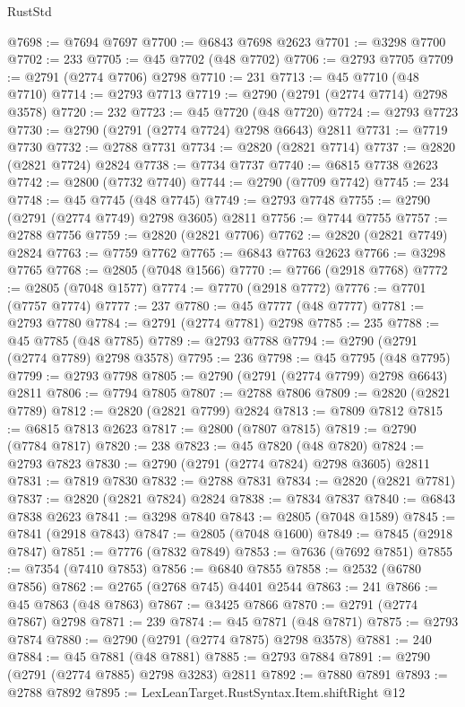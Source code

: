 \begin{lexlean}{RustStd}
\begin{coremodule}
@7698 := @7694 @7697
@7700 := @6843 @7698 @2623
@7701 := @3298 @7700
@7702 := 233
@7705 := @45 @7702 (@48 @7702)
@7706 := @2793 @7705
@7709 := @2791 (@2774 @7706) @2798
@7710 := 231
@7713 := @45 @7710 (@48 @7710)
@7714 := @2793 @7713
@7719 := @2790 (@2791 (@2774 @7714) @2798 @3578)
@7720 := 232
@7723 := @45 @7720 (@48 @7720)
@7724 := @2793 @7723
@7730 := @2790 (@2791 (@2774 @7724) @2798 @6643) @2811
@7731 := @7719 @7730
@7732 := @2788 @7731
@7734 := @2820 (@2821 @7714)
@7737 := @2820 (@2821 @7724) @2824
@7738 := @7734 @7737
@7740 := @6815 @7738 @2623
@7742 := @2800 (@7732 @7740)
@7744 := @2790 (@7709 @7742)
@7745 := 234
@7748 := @45 @7745 (@48 @7745)
@7749 := @2793 @7748
@7755 := @2790 (@2791 (@2774 @7749) @2798 @3605) @2811
@7756 := @7744 @7755
@7757 := @2788 @7756
@7759 := @2820 (@2821 @7706)
@7762 := @2820 (@2821 @7749) @2824
@7763 := @7759 @7762
@7765 := @6843 @7763 @2623
@7766 := @3298 @7765
@7768 := @2805 (@7048 @1566)
@7770 := @7766 (@2918 @7768)
@7772 := @2805 (@7048 @1577)
@7774 := @7770 (@2918 @7772)
@7776 := @7701 (@7757 @7774)
@7777 := 237
@7780 := @45 @7777 (@48 @7777)
@7781 := @2793 @7780
@7784 := @2791 (@2774 @7781) @2798
@7785 := 235
@7788 := @45 @7785 (@48 @7785)
@7789 := @2793 @7788
@7794 := @2790 (@2791 (@2774 @7789) @2798 @3578)
@7795 := 236
@7798 := @45 @7795 (@48 @7795)
@7799 := @2793 @7798
@7805 := @2790 (@2791 (@2774 @7799) @2798 @6643) @2811
@7806 := @7794 @7805
@7807 := @2788 @7806
@7809 := @2820 (@2821 @7789)
@7812 := @2820 (@2821 @7799) @2824
@7813 := @7809 @7812
@7815 := @6815 @7813 @2623
@7817 := @2800 (@7807 @7815)
@7819 := @2790 (@7784 @7817)
@7820 := 238
@7823 := @45 @7820 (@48 @7820)
@7824 := @2793 @7823
@7830 := @2790 (@2791 (@2774 @7824) @2798 @3605) @2811
@7831 := @7819 @7830
@7832 := @2788 @7831
@7834 := @2820 (@2821 @7781)
@7837 := @2820 (@2821 @7824) @2824
@7838 := @7834 @7837
@7840 := @6843 @7838 @2623
@7841 := @3298 @7840
@7843 := @2805 (@7048 @1589)
@7845 := @7841 (@2918 @7843)
@7847 := @2805 (@7048 @1600)
@7849 := @7845 (@2918 @7847)
@7851 := @7776 (@7832 @7849)
@7853 := @7636 (@7692 @7851)
@7855 := @7354 (@7410 @7853)
@7856 := @6840 @7855
@7858 := @2532 (@6780 @7856)
@7862 := @2765 (@2768 @745) @4401 @2544
@7863 := 241
@7866 := @45 @7863 (@48 @7863)
@7867 := @3425 @7866
@7870 := @2791 (@2774 @7867) @2798
@7871 := 239
@7874 := @45 @7871 (@48 @7871)
@7875 := @2793 @7874
@7880 := @2790 (@2791 (@2774 @7875) @2798 @3578)
@7881 := 240
@7884 := @45 @7881 (@48 @7881)
@7885 := @2793 @7884
@7891 := @2790 (@2791 (@2774 @7885) @2798 @3283) @2811
@7892 := @7880 @7891
@7893 := @2788 @7892
@7895 := LexLeanTarget.RustSyntax.Item.shiftRight @12

\end{coremodule}
\end{lexlean}
